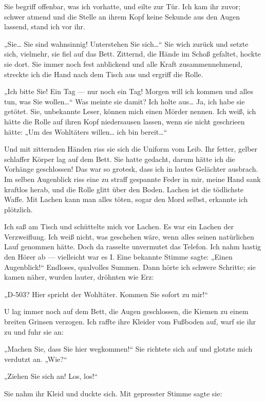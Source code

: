 Sie begriff offenbar, was ich vorhatte, und eilte zur Tür. Ich kam
ihr zuvor; schwer atmend und die Stelle an ihrem Kopf keine Sekunde
aus den Augen lassend, stand ich vor ihr.

„Sie\ldots{} Sie sind wahnsinnig! Unterstehen Sie sich\ldots{}“ Sie wich
zurück und setzte sich, vielmehr, sie fiel auf das Bett. Zitternd,
die Hände im Schoß gefaltet, hockte sie dort. Sie immer noch fest
anblickend und alle Kraft zusammennehmend, streckte ich die Hand
nach dem Tisch aus und ergriff die Rolle.

„Ich bitte Sie! Ein Tag — nur noch ein Tag! Morgen will ich kommen
und alles tun, was Sie wollen\ldots{}“ Was meinte sie damit? Ich holte
aus\ldots{} Ja, ich habe sie getötet. Sie, unbekannte Leser, können mich
einen Mörder nennen. Ich weiß, ich hätte die Rolle auf ihren Kopf
niedersausen lassen, wenn sie nicht geschrieen hätte: „Um des
Wohltäters willen\ldots{} ich bin bereit\ldots{}“

Und mit zitternden Händen riss sie sich die Uniform vom Leib. Ihr
fetter, gelber schlaffer Körper lag auf dem Bett. Sie hatte
gedacht, darum hätte ich die Vorhänge geschlossen! Das war so
grotesk, dass ich in lautes Gelächter ausbrach. Im selben
Augenblick riss eine zu straff gespannte Feder in mir, meine Hand
sank kraftlos herab, und die Rolle glitt über den Boden. Lachen ist
die tödlichste Waffe. Mit Lachen kann man alles töten, sogar den
Mord selbst, erkannte ich plötzlich.

Ich saß am Tisch und schüttelte mich vor Lachen. Es war ein Lachen
der Verzweiflung. Ich weiß nicht, was geschehen wäre, wenn alles
seinen natürlichen Lauf genommen hätte. Doch da rasselte unvermutet
das Telefon. Ich nahm hastig den Hörer ab — vielleicht war es I.
Eine bekannte Stimme sagte: „Einen Augenblick!“ Endloses,
qualvolles Summen. Dann hörte ich schwere Schritte; sie kamen
näher, wurden lauter, dröhnten wie Erz:

„D-503? Hier spricht der Wohltäter. Kommen Sie sofort zu mir!“

U lag immer noch auf dem Bett, die Augen geschlossen, die Kiemen zu
einem breiten Grinsen verzogen. Ich raffte ihre Kleider vom
Fußboden auf, warf sie ihr zu und fuhr sie an:

„Machen Sie, dass Sie hier wegkommen!“ Sie richtete sich auf und
glotzte mich verdutzt an. „Wie?“

„Ziehen Sie sich an! Los, los!“

Sie nahm ihr Kleid und duckte sich. Mit gepresster Stimme sagte
sie:

